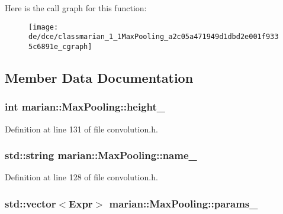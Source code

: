 Here is the call graph for this function\+:
\nopagebreak
\begin{figure}[H]
\begin{center}
\leavevmode
\texttt{[image: de/dce/classmarian\_1\_1MaxPooling\_a2c05a471949d1dbd2e001f9335c6891e\_cgraph]}
\end{center}
\end{figure}




\subsection{Member Data Documentation}
\subsubsection[{\texorpdfstring{height\+\_\+}{height_}}]{\setlength{\rightskip}{0pt plus 5cm}int marian\+::\+Max\+Pooling\+::height\+\_\+\hspace{0.3cm}{\ttfamily [protected]}}\hypertarget{classmarian_1_1MaxPooling_af7cdaff9d9b039ef09684dee1275338d}{}\label{classmarian_1_1MaxPooling_af7cdaff9d9b039ef09684dee1275338d}


Definition at line 131 of file convolution.\+h.

\subsubsection[{\texorpdfstring{name\+\_\+}{name_}}]{\setlength{\rightskip}{0pt plus 5cm}std\+::string marian\+::\+Max\+Pooling\+::name\+\_\+\hspace{0.3cm}{\ttfamily [private]}}\hypertarget{classmarian_1_1MaxPooling_aa39f6708157a3a169ae70c74aa61f611}{}\label{classmarian_1_1MaxPooling_aa39f6708157a3a169ae70c74aa61f611}


Definition at line 128 of file convolution.\+h.

\subsubsection[{\texorpdfstring{params\+\_\+}{params_}}]{\setlength{\rightskip}{0pt plus 5cm}std\+::vector$<${\bf Expr}$>$ marian\+::\+Max\+Pooling\+::params\+\_\+\hspace{0.3cm}{\ttfamily [private]}}\hypertarget{classmarian_1_1MaxPooling_a4002ec5ca7e050ccfefec031bc7627a2}{}\label{classmarian_1_1MaxPooling_a4002ec5ca7e050ccfefec031bc7627a2}


